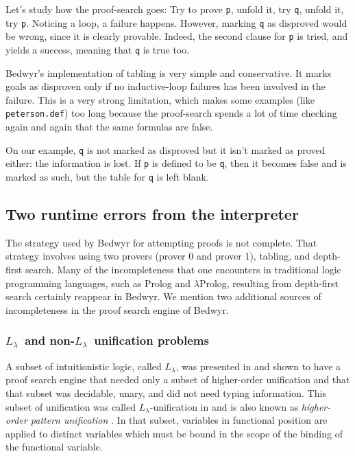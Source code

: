 \documentclass{article}
\newcommand{\lp}{$\lambda$Prolog}
\newcommand{\Ll}{$L_\lambda$}
\begin{document}
Let's study how the proof-search goes:
Try to prove \verb.p., unfold it, try \verb.q., unfold it, try \verb.p..
Noticing a loop, a failure happens.
However, marking \verb.q. as disproved would be wrong,
since it is clearly provable.
Indeed, the second clause for \verb.p. is tried, and yields a 
success, meaning that \verb.q. is true too.

Bedwyr's implementation of tabling is very simple and conservative.
It marks goals as 
disproven only if no inductive-loop failures has been involved in the failure.
This is a very strong limitation, which makes some examples (like 
\verb+peterson.def+) too long because the proof-search spends a lot of time
checking again and again that the same formulas are false.

On our example, \verb.q. is not marked as disproved
but it isn't marked as proved either: the information is lost.
If \verb.p. is defined to be \verb.q.,
then it becomes false and is marked as such,
but the table for \verb.q. is left blank.

\subsection{Two runtime errors from the interpreter}

The strategy used by Bedwyr for attempting proofs is not complete.
That strategy involves using two provers (prover 0 and prover 1),
tabling, and depth-first search.  
Many of the incompleteness that one encounters in
traditional logic programming languages, such as Prolog and \lp,
resulting from depth-first search certainly reappear in Bedwyr.  We
mention two additional sources of incompleteness in the proof search
engine of Bedwyr.

\subsubsection{\Ll\ and non-\Ll\ unification problems}
A subset of intuitionistic logic, called \Ll, was presented in
\cite{miller91jlc} and shown to have a proof search engine that needed
only a subset of higher-order unification and that that subset was
decidable, unary, and did not need typing information.  This subset
of unification was called \Ll-unification in \cite{miller91jlc} and
is also known as {\em higher-order pattern unification}
\cite{nipkow93lics,nadathur05iclp}.  In that subset, variables in
functional position are applied to distinct variables which must be
bound in the scope of the binding of the functional variable.
\end{document}
